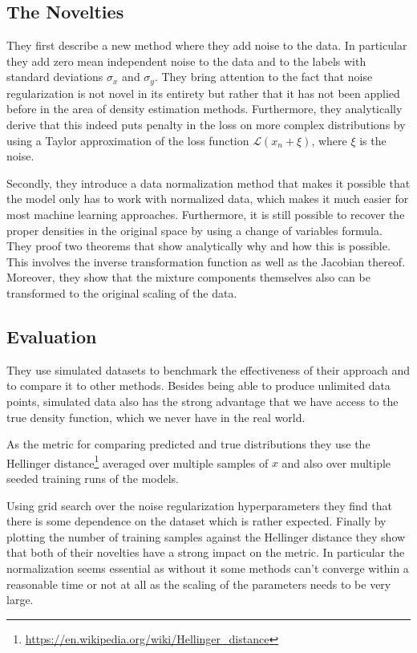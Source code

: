 \documentclass{article}
\begin{document}
\subsection{The Novelties}
They first describe a new method where they add noise to the data. In particular they add zero mean independent noise to the data and to the labels with standard deviations $\sigma_x$ and $\sigma_y$. They bring attention to the fact that noise regularization is not novel in its entirety but rather that it has not been applied before in the area of density estimation methods. Furthermore, they analytically derive that this indeed puts penalty in the loss on more complex distributions by using a Taylor approximation of the loss function $\mathcal{L}\left(x_n + \xi \right)$, where $\xi$ is the noise.


Secondly, they introduce a data normalization method that makes it possible that the model only has to work with normalized data, which makes it much easier for most machine learning approaches. Furthermore, it is still possible to recover the proper densities in the original space by using a change of variables formula. They proof two theorems that show analytically why and how this is possible. This involves the inverse transformation function as well as the Jacobian thereof. Moreover, they show that the mixture components themselves also can be transformed to the original scaling of the data.

\subsection{Evaluation}\label{subsec:evaluation}
They use simulated datasets to benchmark the effectiveness of their approach and to compare it to other methods. Besides being able to produce unlimited data points, simulated data also has the strong advantage that we have access to the true density function, which we never have in the real world.

As the metric for comparing predicted and true distributions they use the Hellinger distance\footnote{\url{https://en.wikipedia.org/wiki/Hellinger_distance}} averaged over multiple samples of $x$ and also over multiple seeded training runs of the models.

Using grid search over the noise regularization hyperparameters they find that there is some dependence on the dataset which is rather expected. Finally by plotting the number of training samples against the Hellinger distance they show that both of their novelties have a strong impact on the metric. In particular the normalization seems essential as without it some methods can't converge within a reasonable time or not at all as the scaling of the parameters needs to be very large.
\end{document}
